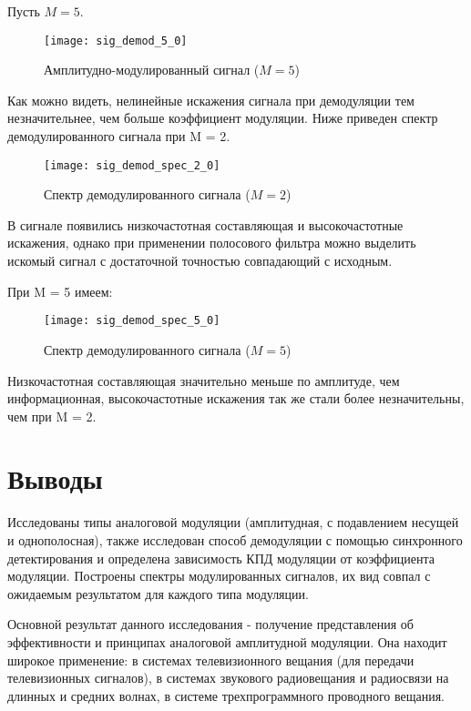 Пусть $M = 5$.
\begin{figure}[H]
	\begin{center}
		\texttt{[image: sig\_demod\_5\_0]}
		\caption{Амплитудно-модулированный сигнал ($M = 5$)} 
		\label{pic:sig_demod_5_0} %
	\end{center}
\end{figure}
Как можно видеть, нелинейные искажения сигнала при демодуляции тем незначительнее, чем больше коэффициент модуляции.
Ниже приведен спектр демодулированного сигнала при M = 2.
\begin{figure}[H]
	\begin{center}
		\texttt{[image: sig\_demod\_spec\_2\_0]}
		\caption{Спектр демодулированного сигнала ($M = 2$)} 
		\label{pic:sig_demod_spec_2_0} %
	\end{center}
\end{figure}
В сигнале появились низкочастотная составляющая и высокочастотные искажения, однако при применении полосового фильтра можно выделить искомый сигнал с достаточной точностью совпадающий с исходным.

При M = 5 имеем:
\begin{figure}[H]
	\begin{center}
		\texttt{[image: sig\_demod\_spec\_5\_0]}
		\caption{Спектр демодулированного сигнала ($M = 5$)} 
		\label{pic:sig_demod_spec_5_0} %
	\end{center}
\end{figure} 
Низкочастотная составляющая значительно меньше по амплитуде, чем информационная, высокочастотные искажения так же стали более незначительны, чем при M = 2. 

\section{Выводы}

Исследованы типы аналоговой модуляции (амплитудная, с подавлением несущей и однополосная), также исследован способ демодуляции с помощью синхронного детектирования и определена зависимость КПД модуляции от коэффициента модуляции. Построены спектры модулированных сигналов, их вид совпал с ожидаемым результатом для каждого типа модуляции.

Основной результат данного исследования - получение представления об эффективности и принципах аналоговой амплитудной модуляции. Она находит широкое применение: в системах телевизионного вещания (для передачи телевизионных сигналов), в системах звукового радиовещания и радиосвязи на длинных и средних волнах,
в системе трехпрограммного проводного вещания.


